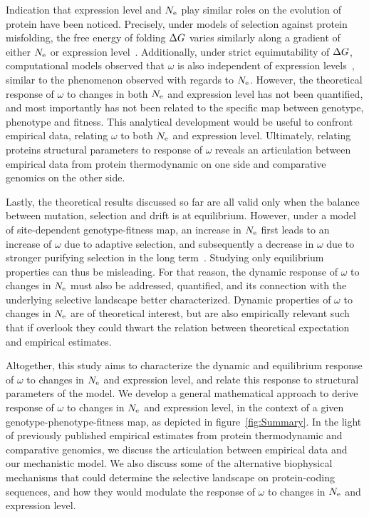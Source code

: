 Indication that expression level and $N_{\mathrm{e}}$ play similar roles on the evolution of protein have been noticed.
Precisely, under models of selection against protein misfolding, the free energy of folding $\Delta G$ varies similarly along a gradient of either $N_{\mathrm{e}}$ or expression level~\citep{Serohijos2013}.
Additionally, under strict equimutability of $\Delta G$, computational models observed that $\omega$ is also independent of expression levels~\citep{Serohijos2012}, similar to the phenomenon observed with regards to $N_{\mathrm{e}}$.
However, the theoretical response of $\omega$ to changes in both $N_{\mathrm{e}}$ and expression level has not been quantified, and most importantly has not been related to the specific map between genotype, phenotype and fitness.
This analytical development would be useful to confront empirical data, relating $\omega$ to both $N_{\mathrm{e}}$ and expression level.
Ultimately, relating proteins structural parameters to response of $\omega$ reveals an articulation between empirical data from protein thermodynamic on one side and comparative genomics on the other side.

Lastly, the theoretical results discussed so far are all valid only when the balance between mutation, selection and drift is at equilibrium.
However, under a model of site-dependent genotype-fitness map, an increase in $N_{\mathrm{e}}$ first leads to an increase of $\omega$ due to adaptive selection, and subsequently a decrease in $\omega$ due to stronger purifying selection in the long term~\citep{Jones2016}.
Studying only equilibrium properties can thus be misleading.
For that reason, the dynamic response of $\omega$ to changes in $N_{\mathrm{e}}$ must also be addressed, quantified, and its connection with the underlying selective landscape better characterized.
Dynamic properties of $\omega$ to changes in $N_{\mathrm{e}}$ are of theoretical interest, but are also empirically relevant such that if overlook they could thwart the relation between theoretical expectation and empirical estimates.

Altogether, this study aims to characterize the dynamic and equilibrium response of $\omega$ to changes in $N_{\mathrm{e}}$ and expression level, and relate this response to structural parameters of the model.
We develop a general mathematical approach to derive response of $\omega$ to changes in $N_{\mathrm{e}}$ and expression level, in the context of a given genotype-phenotype-fitness map, as depicted in figure~\ref{fig:Summary}.
In the light of previously published empirical estimates from protein thermodynamic and comparative genomics, we discuss the articulation between empirical data and our mechanistic model.
We also discuss some of the alternative biophysical mechanisms that could determine the selective landscape on protein-coding sequences, and how they would modulate the response of $\omega$ to changes in $N_{\mathrm{e}}$ and expression level.


